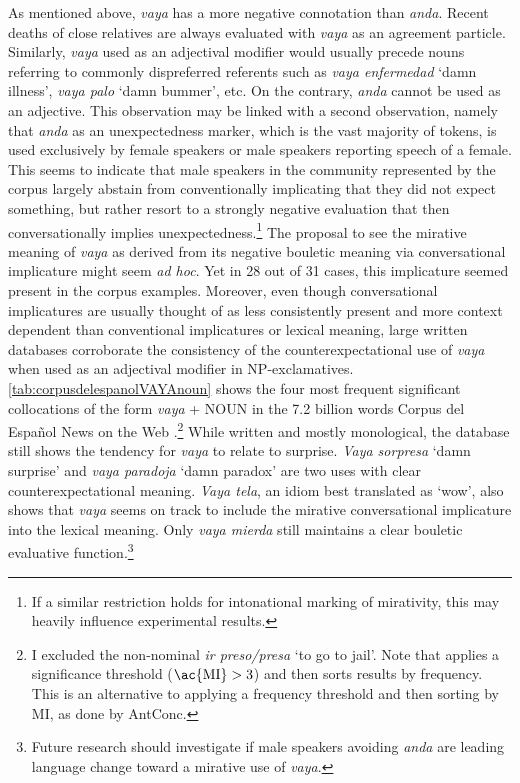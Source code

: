 As mentioned above, \textit{vaya} has a more negative connotation than \textit{anda}. Recent deaths of close relatives are always evaluated with \textit{vaya} as an agreement particle. Similarly, \textit{vaya} used as an adjectival modifier would usually precede nouns referring to commonly dispreferred referents such as \textit{vaya enfermedad} `damn illness', \textit{vaya palo} `damn bummer', etc. On the contrary, \textit{anda} cannot be used as an adjective. This observation may be linked with a second observation, namely that \textit{anda} as an unexpectedness marker, which is the vast majority of tokens, is used exclusively by female speakers or male speakers reporting speech of a female. This seems to indicate that male speakers in the community represented by the corpus largely abstain from conventionally implicating that they did not expect something, but rather resort to a strongly negative evaluation that then conversationally implies unexpectedness.\footnote{If a similar restriction holds for intonational marking of mirativity, this may heavily influence experimental results.} The proposal to see the mirative meaning of \textit{vaya} as derived from its negative bouletic meaning via conversational implicature might seem \textit{ad hoc}. Yet in 28 out of 31 cases, this implicature seemed present in the corpus examples. Moreover, even though conversational implicatures are usually thought of as less consistently present and more context dependent than conventional implicatures or lexical meaning, large written databases corroborate the consistency of the counterexpectational use of \textit{vaya} when used as an adjectival modifier in NP-exclamatives. \autoref{tab:corpusdelespanolVAYAnoun} shows the four most frequent significant collocations of the form \textit{vaya} + NOUN in the 7.2 billion words Corpus del Español News on the Web \citep{Davies.20122019}.\footnote{I excluded the non-nominal \textit{ir preso/presa} `to go to jail'. Note that \citet{Davies.20122019} applies a significance threshold ($\text{\ac{MI}}> 3$) and then sorts results by frequency. This is an alternative to applying a frequency threshold and then sorting by \ac{MI}, as done by AntConc.} While written and mostly monological, the database still shows the tendency for \textit{vaya} to relate to surprise. \textit{Vaya sorpresa} `damn surprise' and \textit{vaya paradoja} `damn paradox' are two uses with clear counterexpectational meaning. \textit{Vaya tela}, an idiom best translated as `wow', also shows that \textit{vaya} seems on track to include the mirative conversational implicature into the lexical meaning. Only \textit{vaya mierda} still maintains a clear bouletic evaluative function.\footnote{Future research should investigate if male speakers avoiding \textit{anda} are leading language change toward a mirative use of \textit{vaya}.}

